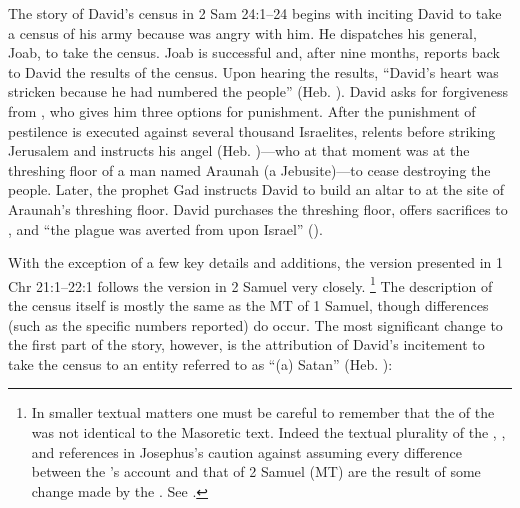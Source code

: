 The story of David's census in 2 Sam 24:1--24 begins with \yahweh inciting David to take a census of his army because \yahweh was angry with him. He dispatches his general, Joab, to take the census. Joab is successful and, after nine months, reports back to David the results of the census. Upon hearing the results, ``David's heart was stricken because he had numbered the people'' (Heb. ). David asks for forgiveness from \yahweh, who gives him three options for punishment. After the punishment of pestilence is executed against several thousand Israelites, \yahweh relents before striking Jerusalem and instructs his angel (Heb. )---who at that moment was at the threshing floor of a man named Araunah (a Jebusite)---to cease destroying the people. Later, the prophet Gad instructs David to build an altar to \yahweh at the site of Araunah's threshing floor. David purchases the threshing floor, offers sacrifices to \yahweh, and ``the plague was averted from upon Israel'' ().

With the exception of a few key details and additions, the version presented in 1 Chr 21:1--22:1 follows the version in 2 Samuel very closely.%
    \footnote{In smaller textual matters one must be careful to remember that the \vorlage of the \chronicler was not identical to the Masoretic text. Indeed the textual plurality of the \lxx, , and references in Josephus's \ant caution against assuming every difference between the \chronicler's account and that of 2 Samuel (MT) are the result of some change made by the \chronicler. See \cite[761--762]{knoppers2007}.}
The description of the census itself is mostly the same as the MT of 1 Samuel, though differences (such as the specific numbers reported) do occur. The most significant change to the first part of the story, however, is the attribution of David's incitement to take the census to an entity referred to as ``(a) Satan'' (Heb. ):

